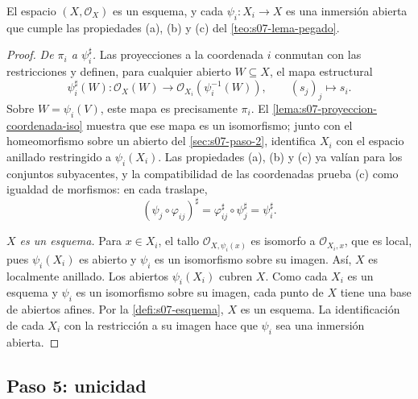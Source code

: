 \begin{prop}
\label{prop:s07-pegado-esquema}
El espacio $(X,\mathcal O_X)$ es un esquema, y cada $\psi_i\colon X_i\to X$ es una inmersión abierta que cumple las propiedades (a), (b) y (c) del \cref{teo:s07-lema-pegado}.
\end{prop}
\begin{proof}
\emph{De $\pi_i$ a $\psi_i^\sharp$.} Las proyecciones a la coordenada $i$ conmutan con las restricciones y definen, para cualquier abierto $W\subseteq X$, el mapa estructural
\[
\psi_i^\sharp(W)\colon \mathcal O_X(W)\longrightarrow
\mathcal O_{X_i}(\psi_i^{-1}(W)),\qquad (s_j)_j\longmapsto s_i.
\]
Sobre $W=\psi_i(V)$, este mapa es precisamente $\pi_i$. El \cref{lema:s07-proyeccion-coordenada-iso} muestra que ese mapa es un isomorfismo; junto con el homeomorfismo sobre un abierto del \cref{sec:s07-paso-2}, identifica $X_i$ con el espacio anillado restringido a $\psi_i(X_i)$. Las propiedades (a), (b) y (c) ya valían para los conjuntos subyacentes, y la compatibilidad de las coordenadas prueba (c) como igualdad de morfismos: en cada traslape,
\[
(\psi_j\circ\varphi_{ij})^\sharp
=\varphi_{ij}^\sharp\circ\psi_j^\sharp=\psi_i^\sharp.
\]

\emph{$X$ es un esquema.} Para $x\in X_i$, el tallo $\mathcal O_{X,\psi_i(x)}$ es isomorfo a $\mathcal O_{X_i,x}$, que es local, pues $\psi_i(X_i)$ es abierto y $\psi_i$ es un isomorfismo sobre su imagen. Así, $X$ es localmente anillado. Los abiertos $\psi_i(X_i)$ cubren $X$. Como cada $X_i$ es un esquema y $\psi_i$ es un isomorfismo sobre su imagen, cada punto de $X$ tiene una base de abiertos afines. Por la \cref{defi:s07-esquema}, $X$ es un esquema. La identificación de cada $X_i$ con la restricción a su imagen hace que $\psi_i$ sea una inmersión abierta.
\end{proof}

\subsection{Paso 5: unicidad}
\label{sec:s07-paso-5}

